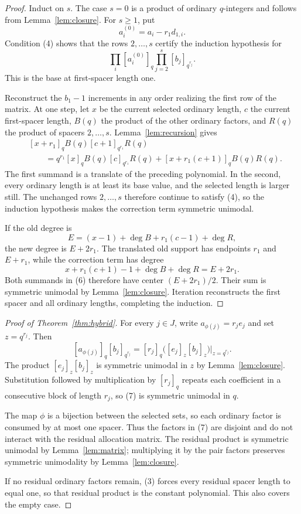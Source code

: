 \documentclass[11pt]{article}
\begin{document}
\begin{proof}
Induct on \(s\).  The case \(s=0\) is a product of ordinary
\(q\)-integers and follows from Lemma~\ref{lem:closure}.  For \(s\geq1\),
put
\[
 a_i^{(0)}=a_i-r_1d_{1,i}.
\]
Condition (4) shows that the rows \(2,\ldots,s\) certify the induction
hypothesis for
\[
 \prod_i[a_i^{(0)}]_q\prod_{j=2}^s[b_j]_{q^{r_j}}.
\]
This is the base at first-spacer length one.

Reconstruct the \(b_1-1\) increments in any order realizing the first row
of the matrix.  At one step, let \(x\) be the current selected ordinary
length, \(c\) the current first-spacer length, \(B(q)\) the product of the
other ordinary factors, and \(R(q)\) the product of spacers
\(2,\ldots,s\).  Lemma~\ref{lem:recursion} gives
\begin{align*}
 &[x+r_1]_qB(q)[c+1]_{q^{r_1}}R(q)\\
 &\qquad=q^{r_1}[x]_qB(q)[c]_{q^{r_1}}R(q)
 +[x+r_1(c+1)]_qB(q)R(q).                         \tag{6}
\end{align*}
The first summand is a translate of the preceding polynomial.  In the
second, every ordinary length is at least its base value, and the selected
length is larger still.  The unchanged rows \(2,\ldots,s\) therefore
continue to satisfy (4), so the induction hypothesis makes the correction
term symmetric unimodal.

If the old degree is
\[
 E=(x-1)+\deg B+r_1(c-1)+\deg R,
\]
the new degree is \(E+2r_1\).  The translated old support has endpoints
\(r_1\) and \(E+r_1\), while the correction term has degree
\[
 x+r_1(c+1)-1+\deg B+\deg R=E+2r_1.
\]
Both summands in (6) therefore have center \((E+2r_1)/2\).  Their sum is
symmetric unimodal by Lemma~\ref{lem:closure}.  Iteration reconstructs the
first spacer and all ordinary lengths, completing the induction.
\end{proof}

\begin{proof}[Proof of Theorem~\ref{thm:hybrid}]
For every \(j\in J\), write \(a_{\phi(j)}=r_je_j\) and set \(z=q^{r_j}\).
Then
\[
 [a_{\phi(j)}]_q[b_j]_{q^{r_j}}
 =[r_j]_q\bigl([e_j]_z[b_j]_z\bigr)\big|_{z=q^{r_j}}. \tag{7}
\]
The product \([e_j]_z[b_j]_z\) is symmetric unimodal in \(z\) by
Lemma~\ref{lem:closure}.  Substitution followed by multiplication by
\([r_j]_q\) repeats each coefficient in a consecutive block of length
\(r_j\), so (7) is symmetric unimodal in \(q\).

The map \(\phi\) is a bijection between the selected sets, so each ordinary
factor is consumed by at most one spacer.  Thus the factors in (7) are
disjoint and do not interact with the residual allocation matrix.  The
residual product is symmetric unimodal by Lemma~\ref{lem:matrix}; multiplying
it by the pair factors preserves symmetric unimodality by
Lemma~\ref{lem:closure}.

If no residual ordinary factors remain, (3) forces every residual spacer
length to equal one, so that residual product is the constant polynomial.
This also covers the empty case.
\end{proof}
\end{document}
